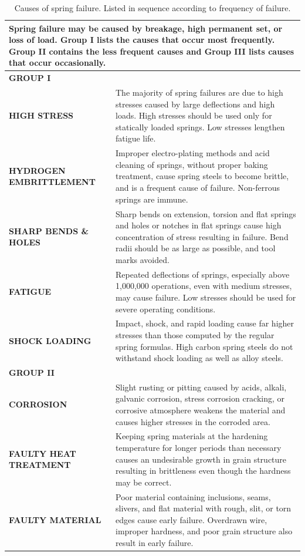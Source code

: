 \documentclass[10pt]{article}
\begin{document}
\begin{table}[h!]
\centering
\caption{Causes of spring failure. Listed in sequence according to frequency of failure.}
\begin{tabularx}{\textwidth}{|p{3cm}|p{12cm}|}
\hline
\multicolumn{2}{|l|}{\textbf{Spring failure may be caused by breakage, high permanent set, or loss of load. Group I lists the causes that occur most frequently. Group II contains the less frequent causes and Group III lists causes that occur occasionally.}} \\
\hline

\multicolumn{2}{|l|}{\textbf{GROUP I}} \\
\hline
\textbf{HIGH STRESS} &
The majority of spring failures are due to high stresses caused by large deflections and high loads. High stresses should be used only for statically loaded springs. Low stresses lengthen fatigue life. \\
\hline
\textbf{HYDROGEN EMBRITTLEMENT} &
Improper electro-plating methods and acid cleaning of springs, without proper baking treatment, cause spring steels to become brittle, and is a frequent cause of failure. Non-ferrous springs are immune. \\
\hline
\textbf{SHARP BENDS \& HOLES} &
Sharp bends on extension, torsion and flat springs and holes or notches in flat springs cause high concentration of stress resulting in failure. Bend radii should be as large as possible, and tool marks avoided. \\
\hline
\textbf{FATIGUE} &
Repeated deflections of springs, especially above 1{,}000{,}000 operations, even with medium stresses, may cause failure. Low stresses should be used for severe operating conditions. \\
\hline
\textbf{SHOCK LOADING} &
Impact, shock, and rapid loading cause far higher stresses than those computed by the regular spring formulas. High carbon spring steels do not withstand shock loading as well as alloy steels. \\
\hline

\multicolumn{2}{|l|}{\textbf{GROUP II}} \\
\hline
\textbf{CORROSION} &
Slight rusting or pitting caused by acids, alkali, galvanic corrosion, stress corrosion cracking, or corrosive atmosphere weakens the material and causes higher stresses in the corroded area. \\
\hline
\textbf{FAULTY HEAT TREATMENT} &
Keeping spring materials at the hardening temperature for longer periods than necessary causes an undesirable growth in grain structure resulting in brittleness even though the hardness may be correct. \\
\hline
\textbf{FAULTY MATERIAL} &
Poor material containing inclusions, seams, slivers, and flat material with rough, slit, or torn edges cause early failure. Overdrawn wire, improper hardness, and poor grain structure also result in early failure. \\
\hline


\end{tabularx}
\end{table}
\end{document}
